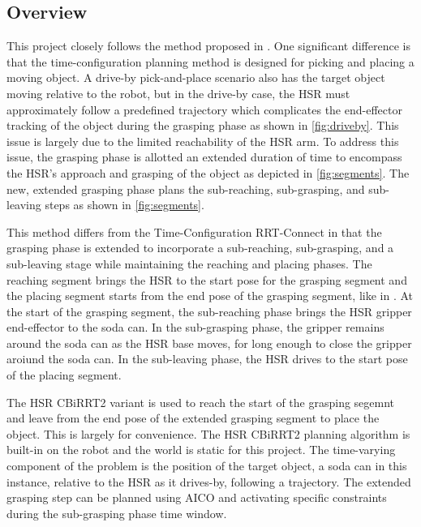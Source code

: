 \documentclass[12pt]{article}
\begin{document}
        \subsection{Overview}
            This project closely follows the method proposed in \cite{yang_planning_2018}. One significant difference is that the time-configuration planning method is designed for picking and placing a moving object. A drive-by pick-and-place scenario also has the target object moving relative to the robot, but in the drive-by case, the HSR must approximately follow a predefined trajectory which complicates the end-effector tracking of the object during the grasping phase as shown in \cref{fig:driveby}. This issue is largely due to the limited reachability of the HSR arm. To address this issue, the grasping phase is allotted an extended duration of time to encompass the HSR's approach and grasping of the object as depicted in \cref{fig:segments}. The new, extended grasping phase plans the sub-reaching, sub-grasping, and sub-leaving steps as shown in \cref{fig:segments}.

            \par This method differs from the Time-Configuration RRT-Connect in that the grasping phase is extended to incorporate a sub-reaching, sub-grasping, and a sub-leaving stage while maintaining the reaching and placing phases. The reaching segment brings the HSR to the start pose for the grasping segment and the placing segment starts from the end pose of the grasping segment, like in \cite{yang_planning_2018}. At the start of the grasping segment, the sub-reaching phase brings the HSR gripper end-effector to the soda can. In the sub-grasping phase, the gripper remains around the soda can as the HSR base moves, for long enough to close the gripper aroiund the soda can. In the sub-leaving phase, the HSR drives to the start pose of the placing segment.

            \par The HSR CBiRRT2 variant is used to reach the start of the  grasping segemnt and leave from the end pose of the extended grasping segment to place the object. This is largely for convenience. The HSR CBiRRT2 planning algorithm is built-in on the robot and the world is static for this project. The time-varying component of the problem is the position of the target object, a soda can in this instance, relative to the HSR as it drives-by, following a trajectory. 
            The extended grasping step can be planned using AICO and activating specific constraints during the sub-grasping phase time window.
        
\end{document}
